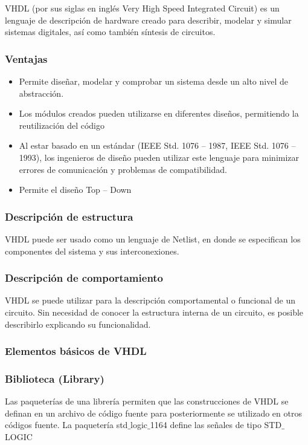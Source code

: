 \documentclass{article}
\begin{document}
VHDL (por sus siglas en inglés Very High Speed Integrated Circuit) es un lenguaje de descripción de hardware creado para describir, modelar y simular  sistemas digitales, así como también síntesis de circuitos. 

\subsubsection{Ventajas}
\begin{itemize}
    \item Permite diseñar, modelar y comprobar un sistema desde un alto nivel de abstracción.
    \item Los módulos creados pueden utilizarse en diferentes diseños, permitiendo la reutilización del código
    \item Al estar basado en un estándar (IEEE Std. 1076 – 1987, IEEE Std. 1076 – 1993), los ingenieros de diseño pueden utilizar este lenguaje para minimizar errores de comunicación y problemas de compatibilidad.
    \item Permite el diseño Top – Down
\end{itemize}

\subsubsection{Descripción de estructura}
VHDL puede ser usado como un lenguaje de Netlist, en donde se especifican los componentes del sistema y sus interconexiones.
\subsubsection{Descripción de comportamiento}
VHDL se puede utilizar para la descripción comportamental o funcional de un circuito. Sin necesidad de conocer la estructura interna de un circuito, es posible describirlo explicando su funcionalidad. 

\subsubsection {Elementos básicos de VHDL}
\subsubsection {Biblioteca (Library)}
Las paqueterías de una librería permiten que las construcciones de VHDL se definan en un archivo de código fuente para posteriormente se utilizado en otros códigos fuente. La paquetería std$\_$logic$\_$1164 define las señales de tipo STD$\_$LOGIC
\end{document}
